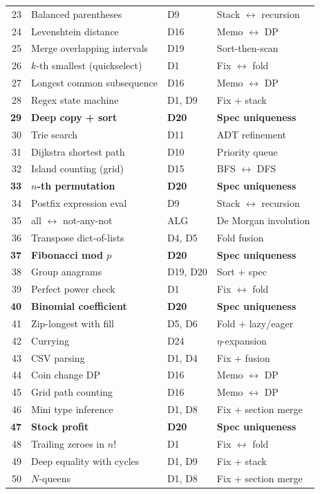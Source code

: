 \begin{center}
\begin{tabular}{r l l l}
  23 & Balanced parentheses & D9 & Stack $\leftrightarrow$ recursion \\
  24 & Levenshtein distance & D16 & Memo $\leftrightarrow$ DP \\
  25 & Merge overlapping intervals & D19 & Sort-then-scan \\
  26 & $k$-th smallest (quickselect) & D1 & Fix $\leftrightarrow$ fold \\
  27 & Longest common subsequence & D16 & Memo $\leftrightarrow$ DP \\
  28 & Regex state machine & D1, D9 & Fix + stack \\
  \textbf{29} & \textbf{Deep copy + sort} & \textbf{D20} &
    \textbf{Spec uniqueness} \\
  30 & Trie search & D11 & ADT refinement \\
  31 & Dijkstra shortest path & D10 & Priority queue \\
  32 & Island counting (grid) & D15 & BFS $\leftrightarrow$ DFS \\
  \textbf{33} & \textbf{$n$-th permutation} & \textbf{D20} &
    \textbf{Spec uniqueness} \\
  34 & Postfix expression eval & D9 & Stack $\leftrightarrow$ recursion \\
  35 & all $\leftrightarrow$ not-any-not & ALG & De Morgan involution \\
  36 & Transpose dict-of-lists & D4, D5 & Fold fusion \\
  \textbf{37} & \textbf{Fibonacci mod $p$} & \textbf{D20} &
    \textbf{Spec uniqueness} \\
  38 & Group anagrams & D19, D20 & Sort + spec \\
  39 & Perfect power check & D1 & Fix $\leftrightarrow$ fold \\
  \textbf{40} & \textbf{Binomial coefficient} & \textbf{D20} &
    \textbf{Spec uniqueness} \\
  41 & Zip-longest with fill & D5, D6 & Fold + lazy/eager \\
  42 & Currying & D24 & $\eta$-expansion \\
  43 & CSV parsing & D1, D4 & Fix + fusion \\
  44 & Coin change DP & D16 & Memo $\leftrightarrow$ DP \\
  45 & Grid path counting & D16 & Memo $\leftrightarrow$ DP \\
  46 & Mini type inference & D1, D8 & Fix + section merge \\
  \textbf{47} & \textbf{Stock profit} & \textbf{D20} &
    \textbf{Spec uniqueness} \\
  48 & Trailing zeroes in $n!$ & D1 & Fix $\leftrightarrow$ fold \\
  49 & Deep equality with cycles & D1, D9 & Fix + stack \\
  50 & $N$-queens & D1, D8 & Fix + section merge \\
\end{tabular}
\end{center}


